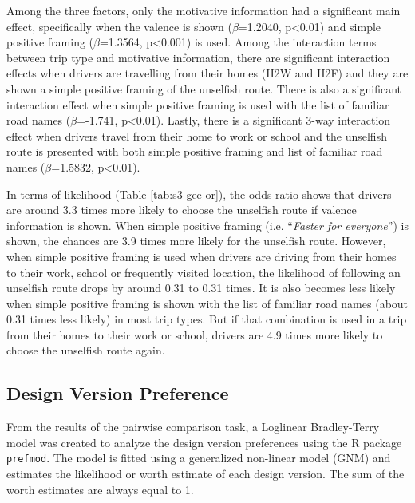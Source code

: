 Among the three factors, only the motivative information had a significant main effect, specifically when the valence is shown ($\beta$=1.2040, p<0.01) and  simple positive framing ($\beta$=1.3564, p<0.001) is used. Among the interaction terms between trip type and motivative information, there are significant interaction effects when drivers are travelling from their homes (H2W and H2F) and they are shown a simple positive framing of the unselfish route. There is also a significant interaction effect when simple positive framing is used with the list of familiar road names ($\beta$=-1.741, p<0.01). Lastly, there is a significant 3-way interaction effect when drivers travel from their home to work or school and the unselfish route is presented with both simple positive framing and list of familiar road names ($\beta$=1.5832, p<0.01). 

In terms of likelihood (Table \ref{tab:s3-gee-or}), the odds ratio shows that drivers are around 3.3 times more likely to choose the unselfish route if valence information is shown. When simple positive framing (i.e. ``\textit{Faster for everyone}'') is shown, the chances are 3.9 times more likely for the unselfish route. However, when simple positive framing is used when drivers are driving from their homes to their work, school or frequently visited location, the likelihood of following an unselfish route drops by around 0.31 to 0.31 times. It is also becomes less likely when simple positive framing is shown with the list of familiar road names (about 0.31 times less likely) in most trip types. But if that combination is used in a trip from their homes to their work or school, drivers are 4.9 times more likely to choose the unselfish route again. 

\subsection{Design Version Preference}
From the results of the pairwise comparison task, a Loglinear Bradley-Terry model was created to analyze the design version preferences using the R package \verb|prefmod|\cite{hatzinger2012prefmod}. The model is fitted using a generalized non-linear model (GNM) and estimates the likelihood or worth estimate of each design version. The sum of the worth estimates are always equal to 1. 

